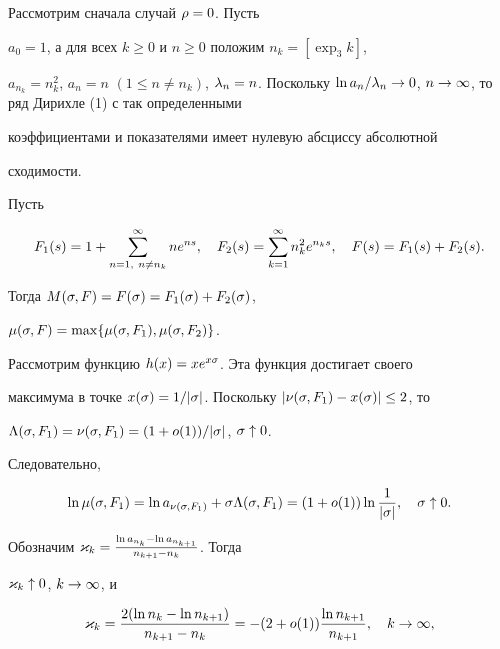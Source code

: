 \begin{pf}


Рассмотрим сначала случай $\rho=0$. Пусть


$a_0=1$, а для всех $k\ge 0$ и $n\ge 0$ положим $n_k=[\exp_3k]$,


$a_{n_k}=n_k^2$, $a_n=n$ $(1\le n\ne n_k)$, $\la_n=n$. Поскольку $\ln


a_n/\la_n\to 0$, $n\to\i$, то ряд Дирихле (1) с так определенными


коэффициентами и показателями имеет нулевую абсциссу абсолютной


сходимости. 





Пусть 


$$


F_1(s)=1+\sum_{n=1,\ n\ne n_k}^\i ne^{ns},\quad


F_2(s)=\sum_{k=1}^\i n_k^2e^{n_ks},\quad F(s)=F_1(s)+F_2(s).


$$


Тогда $M(\sigma,F)=F(\sigma)=F_1(\sigma)+F_2(\sigma)$,


$\mu(\sigma,F)=\max\{\mu(\sigma,F_1),\mu(\sigma,F_2)\}$.





Рассмотрим функцию $h(x)=xe^{x\sigma}$. Эта функция достигает своего


максимума в точке $x(\sigma)=1/|\sigma|$. Поскольку $|\nu(\sigma,F_1)-x(\sigma)|\le 2$, то


$\Lambda(\sigma,F_1)=\nu(\sigma,F_1)=(1+o(1))/|\sigma|$, $\sigma\uparrow 0$.


Следовательно, 


\begin{equation}


\ln\mu(\s,F_1)=\ln a_{\nu(\s,F_1)}+\s\L(\s,F_1)=(1+o(1))\ln\frac{1}{|\s|},


\quad \s\uparrow 0.


\end{equation}





Обозначим $\varkappa_k=\frac{\ln a_{n_k}-\ln a_{n_{k+1}}}{n_{k+1}-n_k}$. Тогда


$\varkappa_k\uparrow 0$, $k\to\infty$, и


$$


\k_k=\frac{2(\ln n_k-\ln n_{k+1})}{n_{k+1}-n_k}=


-(2+o(1))\frac{\ln n_{k+1}}{n_{k+1}},\quad k\to\i,


$$



\end{pf}
